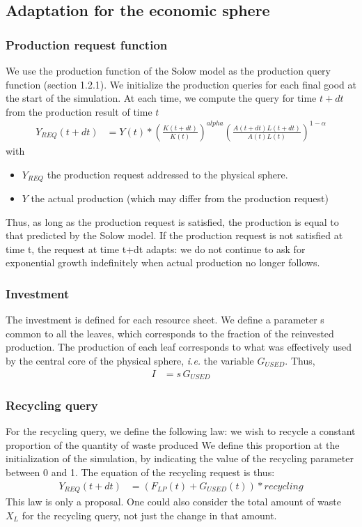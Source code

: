 \documentclass[12pt,a4paper]{article}%
\begin{document}
\begin{appendix}
\subsection{Adaptation for the economic sphere}
\subsubsection{Production request function}
We use the production function of the Solow model as the production query function (section 1.2.1).  We initialize the production queries for each final good at the start of the simulation. At each time, we compute the query for time $t+dt$ from the production result of time $t$
\begin{align}
	 Y_{REQ}(t+dt) &= Y(t)\ast\left( \frac{K(t+dt)}{K(t)}\right) ^{alpha}\left( \frac{A(t+dt)L(t+dt)}{A(t)L(t)}\right) ^{1- \alpha}%
\end{align}
with 
\begin{itemize} 
	\item $Y_{REQ}$ the production request addressed to the physical sphere.  
	\item $Y$ the actual production (which may differ from the production request) 
\end{itemize} 
Thus, as long as the production request is satisfied, the production is equal to that predicted by the Solow model. If the production request is not satisfied at time t, the request at time t+dt adapts: we do not continue to ask for exponential growth indefinitely when actual production no longer follows.  

\subsubsection{Investment}
The investment is defined for each resource sheet. We define a parameter s common to all the leaves, which corresponds to the fraction of the reinvested production. The production of each leaf corresponds to what was effectively used by the central core of the physical sphere, \textit{i.e.} the variable $G_{USED}$.  Thus, 
\begin{align}
	I &= s\, G_{USED}
\end{align}

\subsubsection{Recycling query} 
For the recycling query, we define the following law: we wish to recycle a constant proportion of the quantity of waste produced We define this proportion at the initialization of the simulation, by indicating the value of the recycling parameter between 0 and 1. The equation of the recycling request is thus:
\begin{align}
	Y_{REQ}(t+dt) &= (F_{LP}(t)+G_{USED}(t))\ast recycling
\end{align}
This law is only a proposal. One could also consider the total amount of waste $X_{L}$ for the recycling query, not just the change in that amount.  


\end{appendix}
\end{document}
